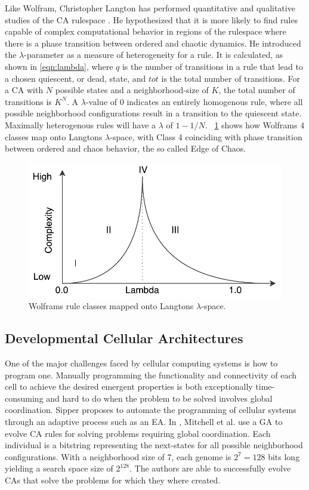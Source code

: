 Like Wolfram, Christopher Langton has performed quantitative and qualitative
studies of the CA rulespace \cite{Langton1990}. He hypothesized that it is more
likely to find rules capable of complex computational behavior in regions of the
rulespace where there is a phase transition between ordered and chaotic
dynamics. He introduced the $\lambda$-parameter as a measure of heterogeneity
for a rule. It is calculated, as shown in \ref{eqn:lambda}, where $q$ is the
number of transitions in a rule that lead to a chosen quiescent, or dead, state,
and $tot$ is the total number of transitions. For a CA with $N$ possible states
and a neighborhood-size of $K$, the total number of transitions is $K^N$. A
$\lambda$-value of $0$ indicates an entirely homogenous rule, where all possible
neighborhood configurations result in a transition to the quiescent state.
Maximally heterogenous rules will have a $\lambda$ of $1-1/N$.
\figurename~\ref{fig:ca-classes} shows how Wolframs 4 classes map onto Langtons
$\lambda$-space, with Class 4 coinciding with phase transition between ordered
and chaos behavior, the so called Edge of Chaos.

\begin{figure}[ht]
  \centering
  \includegraphics[width=0.5\linewidth]{fig/ca-classes}
  \caption[Wolframs rule classes mapped onto Langtons $\lambda$-space]{Wolframs rule classes mapped onto Langtons $\lambda$-space.}
  \label{fig:ca-classes}
\end{figure}


\subsection{Developmental Cellular Architectures}

One of the major challenges faced by cellular computing systems is how to
program one. Manually programming the functionality and connectivity of each
cell to achieve the desired emergent properties is both exceptionally
time-consuming and hard to do when the problem to be solved involves global
coordination. Sipper proposes to automate the programming of cellular systems
through an adaptive process such as an EA. In \cite{Mitchell1993}, Mitchell et
al. use a GA to evolve CA rules for solving problems requiring global
coordination. Each individual is a bitstring representing the next-states for
all possible neighborhood configurations. With a neighborhood size of 7, each
genome is $2^7=128$ bits long yielding a search space size of $2^{128}$. The
authors are able to successfully evolve CAs that solve the problems for which
they where created.

